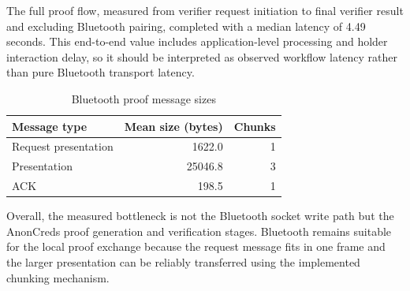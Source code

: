 The full proof flow, measured from verifier request initiation to final verifier result and excluding Bluetooth pairing, completed with a median latency of 4.49 seconds. This end-to-end value includes application-level processing and holder interaction delay, so it should be interpreted as observed workflow latency rather than pure Bluetooth transport latency.

\begin{table}[h]
\centering
\caption{Bluetooth proof message sizes}
\label{tab:bluetooth-message-size}
\begin{tabular}{lrr}
\hline
Message type & Mean size (bytes) & Chunks \\
\hline
Request presentation & 1622.0 & 1 \\
Presentation & 25046.8 & 3 \\
ACK & 198.5 & 1 \\
\hline
\end{tabular}
\end{table}

Overall, the measured bottleneck is not the Bluetooth socket write path but the AnonCreds proof generation and verification stages. Bluetooth remains suitable for the local proof exchange because the request message fits in one frame and the larger presentation can be reliably transferred using the implemented chunking mechanism.
